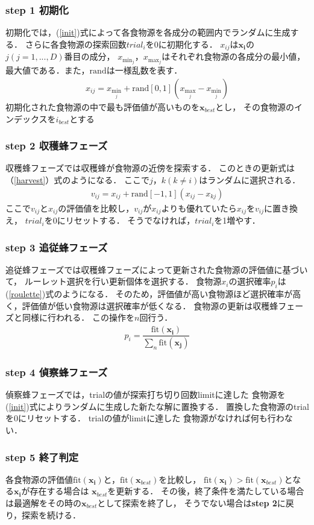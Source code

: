 \subsubsection*{step 1 初期化}
初期化では，(\ref{init})式によって各食物源を各成分の範囲内でランダムに生成する．
さらに各食物源の探索回数$trial_i$を0に初期化する．
$x_{ij}$は$\boldsymbol{x_{i}}$の$j(j=1,...,D)$番目の成分， 
$x_{\min_j}$，$x_{\max_j}$はそれぞれ食物源の各成分の最小値，最大値である．また，$\mathrm{rand}$は一様乱数を表す． 
\begin{align}
    x_{ij} = x_{\min_j} + \mathrm{rand}[0,1](x_{\max_j}-x_{\min_j})\label{init}
\end{align}
初期化された食物源の中で最も評価値が高いものを$\boldsymbol{x}_{best}$とし，
その食物源のインデックスを$i_{best}$とする
\subsubsection*{step 2 収穫蜂フェーズ}
収穫蜂フェーズでは収穫蜂が食物源の近傍を探索する．
このときの更新式は（\ref{harvest}）式のようになる．
ここで$j，k(k\neq i)$はランダムに選択される．
\begin{align}
v_{ij} = x_{ij} + \mathrm{rand}[-1,1](x_{ij}-x_{kj})\label{harvest}
\end{align}
ここで$v_{ij}$と$x_{ij}$の評価値を比較し，$v_{ij}$が$x_{ij}$よりも優れていたら$x_{ij}$を$v_{ij}$に置き換え，
$trial_i$を0にリセットする．
そうでなければ，$trial_i$を1増やす．
\subsubsection*{step 3 追従蜂フェーズ}
追従蜂フェーズでは収穫蜂フェーズによって更新された食物源の評価値に基づいて，
ルーレット選択を行い更新個体を選択する．
食物源$x_i$の選択確率$p_i$は(\ref{roulette})式のようになる．
そのため，評価値が高い食物源ほど選択確率が高く，評価値が低い食物源は選択確率が低くなる．
食物源の更新は収穫蜂フェーズと同様に行われる．
この操作を$n$回行う．
\begin{align}
    p_i = \dfrac{\mathrm{fit}(\boldsymbol{x_{i}})}{\sum_{n}\mathrm{fit}(\boldsymbol{x_{j}})}\label{roulette}
\end{align}
\subsubsection*{step 4 偵察蜂フェーズ}
偵察蜂フェーズでは，trialの値が探索打ち切り回数limitに達した
食物源を(\ref{init})式によりランダムに生成した新たな解に置換する． 
置換した食物源のtrialを0にリセットする．
trialの値がlimitに達した
食物源がなければ何も行わない．
\subsubsection*{step 5 終了判定}
各食物源の評価値$\mathrm{fit}(\boldsymbol{x_{i}})$と，$\mathrm{fit}(\boldsymbol{x}_{best})$を比較し，
$\mathrm{fit}(\boldsymbol{x_{i}}) > \mathrm{fit}(\boldsymbol{x}_{best})$となる$\boldsymbol{x_{i}}$が存在する場合は
$\boldsymbol{x}_{best}$を更新する．
その後，終了条件を満たしている場合は最適解をその時の$\boldsymbol{x}_{best}$として探索を終了し，
そうでない場合は\textbf{step 2}に戻り，探索を続ける．
